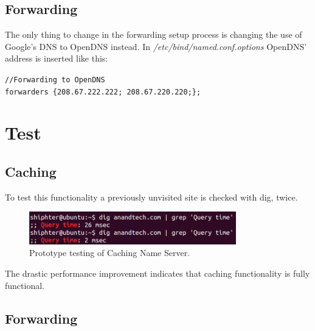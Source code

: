 \subsection{Forwarding}
The only thing to change in the forwarding setup process is changing the use of Google's DNS to OpenDNS instead. In \emph{/etc/bind/named.conf.options} OpenDNS' address is inserted like this:

\texttt{//Forwarding to OpenDNS} \\
\texttt{forwarders \{208.67.222.222; 208.67.220.220;\};}

\section{Test}
\subsection{Caching}
To test this functionality a previously unvisited site is checked with dig, twice.

\begin{figure}[ht!]
\centering
\includegraphics[width=90mm]{img/prototype_caching_test.png}
\caption{Prototype testing of Caching Name Server.}
\label{prototype_caching_test}
\end{figure}

The drastic performance improvement indicates that caching functionality is fully functional.

\subsection{Forwarding}